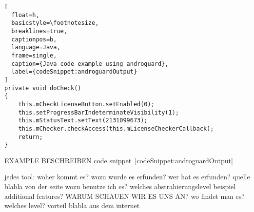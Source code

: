 \begin{lstlisting}[
  float=h,
  basicstyle=\footnotesize,
  breaklines=true,
  captionpos=b,
  language=Java,
  frame=single,
  caption={Java code example using androguard},
  label={codeSnippet:androguardOutput}
]
private void doCheck()
{
    this.mCheckLicenseButton.setEnabled(0);
    this.setProgressBarIndeterminateVisibility(1);
    this.mStatusText.setText(2131099673);
    this.mChecker.checkAccess(this.mLicenseCheckerCallback);
    return;
}
\end{lstlisting}
EXAMPLE BESCHREIBEN code snippet~\ref{codeSnippet:androguardOutput}


jedes tool:\newline
woher kommt es?\newline
wozu wurde es erfunden?\newline
wer hat es erfunden? quelle\newline
blabla von der seite\newline
wozu benutze ich es?\newline
welches abstrahierungslevel\newline
beispiel\newline
additional features?\newline
WARUM SCHAUEN WIR ES UNS AN?\newline
wo findet man es?\newline
welches level?\newline
vorteil\newline
blabla aus dem internet\newline
